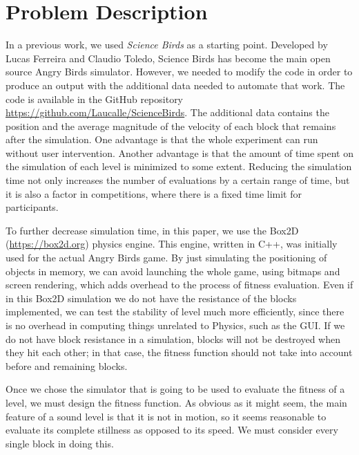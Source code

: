 \documentclass[a4paper,twoside]{article}
\begin{document}
\section{Problem Description}
\label{sec:angry}
In a previous work, we used {\em Science Birds} \cite{ferreira2014search}  as a starting point. Developed by Lucas Ferreira and Claudio Toledo, Science Birds has become the main open source Angry Birds simulator. However, we needed to modify the code in order to produce an output with the additional data needed to automate that work. The code is available in the GitHub repository \url{https://github.com/Laucalle/ScienceBirds}. The additional data contains the position and the average magnitude of the velocity of each block that remains after the simulation. One advantage is that the whole experiment can run without user intervention. Another advantage is that the amount of time spent on the simulation of each level is minimized to some extent.  Reducing the simulation time not only increases the number of evaluations by a certain range of time, but it is also a factor in competitions, where there is a fixed time limit for participants.


To further decrease simulation time, in this paper, we use the Box2D (\url{https://box2d.org}) physics engine. This engine, written in C++, was initially used for the actual Angry Birds game. By just simulating the positioning of objects in memory, we can avoid launching the whole game, using bitmaps and screen rendering, which adds overhead to the process of fitness evaluation. Even if in this Box2D simulation we do not have the resistance of the blocks implemented, we can test the stability of level much more efficiently, since there is no overhead in computing things unrelated to Physics, such as the GUI. If we do not have block resistance in a simulation, blocks will not be destroyed when they hit each other; in that case, the fitness function should not take into account before and remaining blocks.


Once we chose the simulator that is going to be used to evaluate the fitness of a level, we must design the fitness function. As obvious as it might seem, the main feature of a sound level is that it is not in motion, so it seems reasonable to evaluate its complete stillness as opposed to its speed. We must consider every single block in doing this. 
\end{document}
